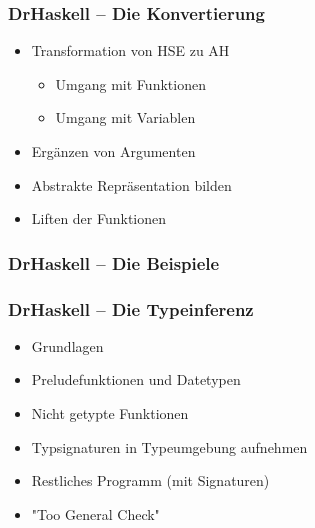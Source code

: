 \begin{frame}
	\frametitle{DrHaskell -- Die Konvertierung}
	\begin{itemize}
		\item Transformation von HSE zu AH
		  \begin{itemize}
		    \item Umgang mit Funktionen
		    \item Umgang mit Variablen
		  \end{itemize}
		\item Ergänzen von Argumenten
		\item Abstrakte Repräsentation bilden
		\item Liften der Funktionen
	\end{itemize}
\end{frame}

\begin{frame}[fragile]
\frametitle{DrHaskell -- Die Beispiele}

\end{frame}

\begin{frame}
  \frametitle{DrHaskell -- Die Typeinferenz}
  \begin{itemize}
    \item Grundlagen
    \item Preludefunktionen und Datetypen
    \item Nicht getypte Funktionen
    \item Typsignaturen in Typeumgebung aufnehmen
    \item Restliches Programm (mit Signaturen)
    \item "Too General Check"
  \end{itemize}
\end{frame}
